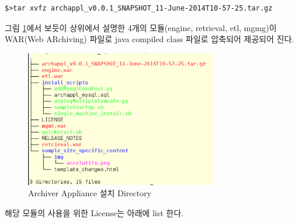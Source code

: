 \documentclass[11pt
  , a4paper
  , article
  , oneside
]{memoir}
\begin{document}
\begin{lstlisting}[style=termstyle]
$>tar xvfz archappl_v0.0.1_SNAPSHOT_11-June-2014T10-57-25.tar.gz
\end{lstlisting}

그림 \ref{fig:appli_tree}에서 보듯이 상위에서 설명한 4개의 모듈(engine, retrieval, etl, mgmg)이 WAR(Web ARchiving) 파일로 java compiled class 파일로 압축되어 제공되어 진다.

\begin{figure}[h!]
	\centering
	\includegraphics[width=0.75\textwidth, height=0.25\textheight]{./images/appli_tree.eps}
	\caption{Archiver Appliance 설치 Directory}
	\label{fig:appli_tree} 
\end{figure}


\clearpage

해당 모듈의 사용을 위한 License는 아래에 list 한다.
\end{document}
